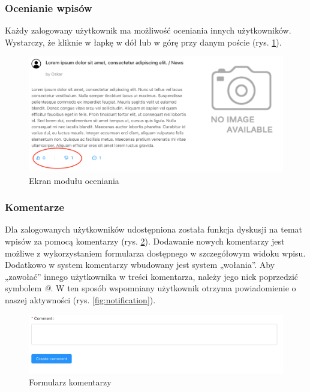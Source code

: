 \documentclass[declaration,shortabstract,polish,inz]{iithesis}
\begin{document}
\subsubsection{Ocenianie wpisów}
Każdy zalogowany użytkownik ma możliwość oceniania innych użytkowników. Wystarczy, że kliknie w łapkę w dół lub w górę przy danym poście (rys. \ref{fig:like}).
\begin{figure}[H]
    \centering
    \includegraphics[width=\linewidth]{images/like.png}
    \caption{Ekran modułu oceniania}
    \label{fig:like}
\end{figure}

\subsubsection{Komentarze}
Dla zalogowanych użytkowników udostępniona została funkcja dyskusji na temat wpisów za pomocą komentarzy (rys. \ref{fig:comment}). Dodawanie nowych komentarzy jest możliwe z wykorzystaniem formularza dostępnego w szczegółowym widoku wpisu. Dodatkowo w system komentarzy wbudowany jest system „wołania”. Aby „zawołać” innego użytkownika w treści komentarza, należy jego nick poprzedzić symbolem \textit{@}. W ten sposób wspomniany użytkownik otrzyma powiadomienie o naszej aktywności (rys. \ref{fig:notification}).

\begin{figure}[H]
    \centering
    \includegraphics[width=\linewidth]{images/komentarz.png}
    \caption{Formularz komentarzy}
    \label{fig:comment}
\end{figure}
\end{document}
